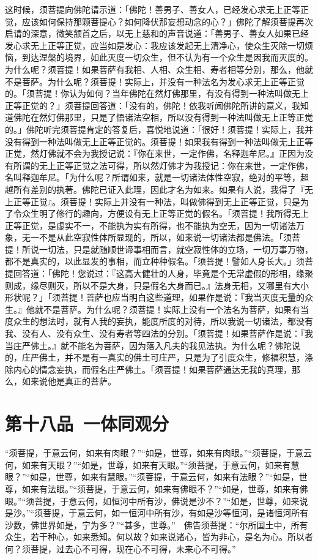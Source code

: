 \documentclass[12pt,twoside,openany]{book}
\newcommand{\kai}[1]{{\CJKfamily{kai}#1}}
\begin{document}
\kai{这时候，须菩提向佛陀请示道：「佛陀！善男子、善女人，已经发心求无上正等正觉，应该如何保持那颗菩提心？如何降伏那妄想动念的心？」佛陀了解须菩提再次启请的深意，微笑颔首之后，以无上慈和的声音说道：「善男子、善女人如果已经发心求无上正等正觉，应当如是发心：我应该发起无上清净心，使众生灭除一切烦恼，到达涅槃的境界，如此灭度一切众生，但不认为有一个众生是因我而灭度的。为什么呢？须菩提！如果菩萨有我相、人相、众生相、寿者相等分别，那么，他就不是菩萨。为什么呢？须菩提！实际上，并没有一种法名为发心求无上正等正觉的。「须菩提！你认为如何？当年佛陀在然灯佛那里，有没有得到一种法叫做无上正等正觉的？」须菩提回答道：「没有的，佛陀！依我听闻佛陀所讲的意义，我知道佛陀在然灯佛那里，只是了悟诸法空相，所以没有得到一种法叫做无上正等正觉的。」佛陀听完须菩提肯定的答复后，喜悦地说道：「很好！须菩提！实际上，我并没有得到一种法叫做无上正等正觉的。须菩提！如果我有得到一种法叫做无上正等正觉，然灯佛就不会为我授记说：『你在来世，一定作佛，名释迦牟尼。』正因为没有所谓的无上正等正觉之法可得，所以然灯佛才为我授记：你在来世，一定作佛，名叫释迦牟尼。「为什么呢？所谓如来，就是一切诸法体性空寂，绝对的平等，超越所有差别的执著。佛陀已证入此理，因此才名为如来。如果有人说，我得了『无上正等正觉』。须菩提！实际上并没有一种法，叫做佛得到无上正等正觉，只是为了令众生明了修行的趣向，方便设有无上正等正觉的假名。「须菩提！我所得无上正等正觉，是虚实不一，不能执为实有所得，也不能执为空无，因为一切诸法万象，无一不是从此空寂性体所显现的，所以，如来说一切诸法都是佛法。「须菩提！所说一切法，只是就随顺世谛事相而言，就空寂性体的立场，一切万事万物，都不是真实的，以此显发的事相，而立种种假名。「须菩提！譬如人身长大。」须菩提回答道：「佛陀！您说过：『这高大健壮的人身，毕竟是个无常虚假的形相，缘聚则成，缘尽则灭，所以不是大身，只是假名大身而已。』法身无相，又哪里有大小形状呢？」「须菩提！菩萨也应当明白这些道理，如果作是说：『我当灭度无量的众生。』他就不是菩萨。为什么呢？须菩提！实际上没有一个法名为菩萨，如果有当度众生的想法时，就有人我的妄执，能度所度的对待，所以我说一切诸法，都没有我、没有人、没有众生、没有寿者等四法的分别。「须菩提！如果菩萨作是说：『我当庄严佛土。』就不能名为菩萨，因为落入凡夫的我见法执。为什么呢？佛陀说的，庄严佛土，并不是有一真实的佛土可庄严，只是为了引度众生，修福积慧，涤除内心的情念妄执，而假名庄严佛土。「须菩提！如果菩萨通达无我的真理，那么，如来说他是真正的菩萨。}

\chapter{第十八品\ 一体同观分}
\begin{pinyinscope}
“须菩提，于意云何，如来有肉眼？”“如是，世尊，如来有肉眼。”“须菩提，于意云何，如来有天眼？”“如是，世尊，如来有天眼。”“须菩提，于意云何，如来有慧眼？”“如是，世尊，如来有慧眼。”“须菩提，于意云何，如来有法眼？”“如是，世尊，如来有法眼。”“须菩提，于意云何，如来有佛眼不？”“如是，世尊，如来有佛眼。”“须菩提，于意云何，如恒河中所有沙，佛说是沙不？”“如是，世尊，如来说是沙。”“须菩提，于意云何，如一恒河中所有沙，有如是沙等恒河，是诸恒河所有沙数，佛世界如是，宁为多？”“甚多，世尊。”　佛告须菩提：“尔所国土中，所有众生，若干种心，如来悉知。何以故？如来说诸心，皆为非心，是名为心。所以者何？须菩提，过去心不可得，现在心不可得，未来心不可得。”
\end{pinyinscope}
\end{document}
